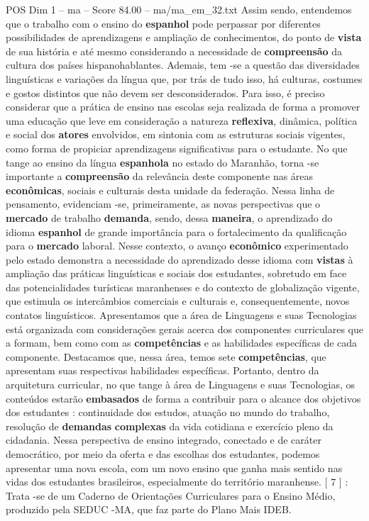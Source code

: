 \begin{textsample}{POS Dim 1 – ma – Score 84.00 – ma/ma\_em\_32.txt}
Assim sendo, entendemos que o trabalho com o ensino do \textbf{espanhol} pode perpassar por diferentes possibilidades de aprendizagens e ampliação de conhecimentos, do ponto de \textbf{vista} de sua história e até mesmo considerando a necessidade de \textbf{compreensão} da cultura dos países hispanohablantes.
Ademais, tem -se a questão das diversidades linguísticas e variações da língua que, por trás de tudo isso, há culturas, costumes e gostos distintos que não devem ser desconsiderados.
Para isso, é preciso considerar que a prática de ensino nas escolas seja realizada de forma a promover uma educação que leve em consideração a natureza \textbf{reflexiva}, dinâmica, política e social dos \textbf{atores} envolvidos, em sintonia com as estruturas sociais vigentes, como forma de propiciar aprendizagens significativas para o estudante.
No que tange ao ensino da língua \textbf{espanhola} no estado do Maranhão, torna -se importante a \textbf{compreensão} da relevância deste componente nas áreas \textbf{econômicas}, sociais e culturais desta unidade da federação.
Nessa linha de pensamento, evidenciam -se, primeiramente, as novas perspectivas que o \textbf{mercado} de trabalho \textbf{demanda}, sendo, dessa \textbf{maneira}, o aprendizado do idioma \textbf{espanhol} de grande importância para o fortalecimento da qualificação para o \textbf{mercado} laboral.
Nesse contexto, o avanço \textbf{econômico} experimentado pelo estado demonstra a necessidade do aprendizado desse idioma com \textbf{vistas} à ampliação das práticas linguísticas e sociais dos estudantes, sobretudo em face das potencialidades turísticas maranhenses e do contexto de globalização vigente, que estimula os intercâmbios comerciais e culturais e, consequentemente, novos contatos linguísticos.
Apresentamos que a área de Linguagens e suas Tecnologias está organizada com considerações gerais acerca dos componentes curriculares que a formam, bem como com as \textbf{competências} e as habilidades específicas de cada componente.
Destacamos que, nessa área, temos sete \textbf{competências}, que apresentam suas respectivas habilidades específicas.
Portanto, dentro da arquitetura curricular, no que tange à área de Linguagens e suas Tecnologias, os conteúdos estarão \textbf{embasados} de forma a contribuir para o alcance dos objetivos dos estudantes : continuidade dos estudos, atuação no mundo do trabalho, resolução de \textbf{demandas} \textbf{complexas} da vida cotidiana e exercício pleno da cidadania.
Nessa perspectiva de ensino integrado, conectado e de caráter democrático, por meio da oferta e das escolhas dos estudantes, podemos apresentar uma nova escola, com um novo ensino que ganha mais sentido nas vidas dos estudantes brasileiros, especialmente do território maranhense. [ 7 ] : Trata -se de um Caderno de Orientações Curriculares para o Ensino Médio, produzido pela SEDUC -MA, que faz parte do Plano Mais IDEB.


\end{textsample}
